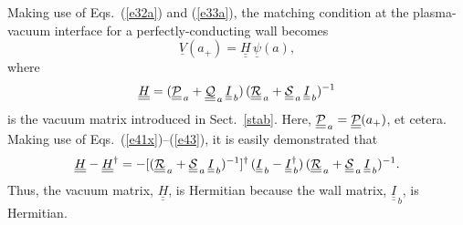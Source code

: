 \documentclass[12pt,prb,aps]{revtex4-1}
\begin{document}
  Making use of Eqs.~(\ref{e32a}) and (\ref{e33a}),  the matching condition at the plasma-vacuum interface  for a perfectly-conducting wall becomes 
 \begin{equation}
 \underline{V}(a_+)= \underline{\underline{H}}\,\underline{\psi}(a),
 \end{equation}
 where 
 \begin{equation}
 \underline{\underline{H}}= (\underline{\underline{\cal P}}_{\,a}+\underline{\underline{\cal Q}}_{\,a}\,\underline{\underline{I}}_{\,b})\,(\underline{\underline{\cal R}}_{\,a}+\underline{\underline{\cal S}}_{\,a}\,\underline{\underline{I}}_{\,b})^{-1}
 \end{equation}
 is  the vacuum matrix introduced in Sect.~\ref{stab}. 
  Here, $\underline{\underline{\cal P}}_{\,a}= \underline{\underline{\cal P}}(a_+)$, et cetera. 
Making use of Eqs.~(\ref{e41x})--(\ref{e43}), it is easily demonstrated that
 \begin{equation}\label{e53}
 \underline{\underline{H}}-\underline{\underline{H}}^\dag =- [(\underline{\underline{\cal R}}_{\,a}+\underline{\underline{\cal S}}_{\,a}\,\underline{\underline{I}}_{\,b})^{-1}]^{\dag}\,(\underline{\underline{I}}_{\,b} -\underline{\underline{I}}^\dag_{\,b})\,  (\underline{\underline{\cal R}}_{\,a}+\underline{\underline{\cal S}}_{\,a}\,\underline{\underline{I}}_{\,b})^{-1}.
\end{equation}
Thus,  the vacuum matrix, $\underline{\underline{H}}$, is Hermitian because  the wall matrix, $\underline{\underline{I}}_{\,b}$, is Hermitian. 
\end{document}
